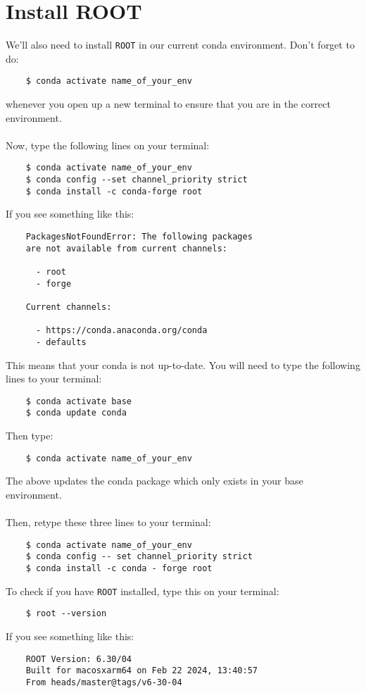 \documentclass[12pt, english]{article}
\begin{document}
\section{Install ROOT}
We'll also need to install \texttt{ROOT} in our current conda environment. Don't forget to do: 
\begin{lstlisting}
    $ conda activate name_of_your_env
\end{lstlisting}
whenever you open up a new terminal to ensure that you are in the correct environment. \\\\
Now, type the following lines on your terminal:
\begin{lstlisting}
    $ conda activate name_of_your_env
    $ conda config --set channel_priority strict
    $ conda install -c conda-forge root
\end{lstlisting}
If you see something like this:
\begin{lstlisting}
    PackagesNotFoundError: The following packages 
    are not available from current channels:
    
      - root
      - forge
    
    Current channels:
    
      - https://conda.anaconda.org/conda
      - defaults
\end{lstlisting}
This means that your conda is not up-to-date. You will need to type the following lines to your terminal:
\begin{lstlisting}
    $ conda activate base
    $ conda update conda
\end{lstlisting}
Then type:
\begin{lstlisting}
    $ conda activate name_of_your_env
\end{lstlisting}
The above updates the conda package which only exists in your base environment. \\\\
Then, retype these three lines to your terminal:
\begin{lstlisting}
    $ conda activate name_of_your_env
    $ conda config -- set channel_priority strict
    $ conda install -c conda - forge root
\end{lstlisting}
To check if you have \texttt{ROOT} installed, type this on your terminal:
\begin{lstlisting}
    $ root --version
\end{lstlisting}
If you see something like this:
\begin{lstlisting}
    ROOT Version: 6.30/04
    Built for macosxarm64 on Feb 22 2024, 13:40:57
    From heads/master@tags/v6-30-04
\end{lstlisting}
\end{document}
